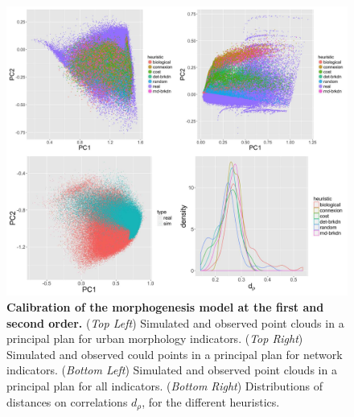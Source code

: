 \documentclass[11pt]{article}
\begin{document}
\begin{figure}
	\includegraphics[width=\linewidth]{7-2-2-fig-mesocoevolmodel-calibration.jpg}
	\caption{\textbf{Calibration of the morphogenesis model at the first and second order.} (\textit{Top Left}) Simulated and observed point clouds in a principal plan for urban morphology indicators. (\textit{Top Right}) Simulated and observed could points in a principal plan for network indicators. (\textit{Bottom Left}) Simulated and observed point clouds in a principal plan for all indicators. (\textit{Bottom Right}) Distributions of distances on correlations $d_{\rho}$, for the different heuristics.\label{fig:mesocoevolmodel:calibration}}
\end{figure}
\end{document}
